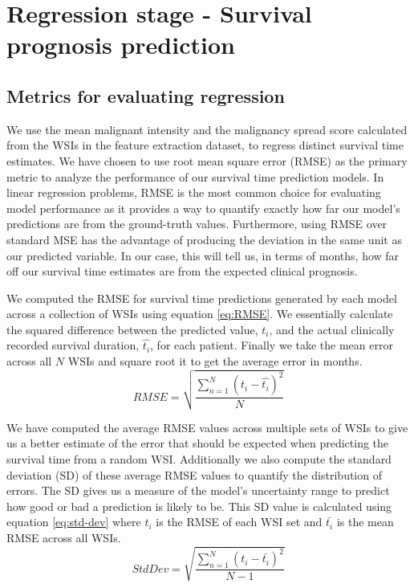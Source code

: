 \documentclass{l4proj}
\begin{document}
\section{Regression stage - Survival prognosis prediction}
\subsection{Metrics for evaluating regression}
We use the mean malignant intensity and the malignancy spread score calculated from the WSIs in the feature extraction dataset, to regress distinct survival time estimates. We have chosen to use root mean square error (RMSE) as the primary metric to analyze the performance of our survival time prediction models. In linear regression problems, RMSE is the most common choice for evaluating model performance as it provides a way to quantify exactly how far our model's predictions are from the ground-truth values. Furthermore, using RMSE over standard MSE has the advantage of producing the deviation in the same unit as our predicted variable. In our case, this will tell us, in terms of months, how far off our survival time estimates are from the expected clinical prognosis. 

We computed the RMSE for survival time predictions generated by each model across a collection of WSIs using equation \ref{eq:RMSE}. We essentially calculate the squared difference between the predicted value, \(t_{i}\), and the actual clinically recorded survival duration, \(\hat{t_{i}}\), for each patient. Finally we take the mean error across all \(N\) WSIs and square root it to get the average error in months. 
\begin{equation} \label{eq:RMSE}
    RMSE = \sqrt{\frac{\sum_{n=1}^{N} (t_{i} - \hat{t_{i}})^2}{N}}
\end{equation}

We have computed the average RMSE values across multiple sets of WSIs to give us a better estimate of the error that should be expected when predicting the survival time from a random WSI. Additionally we also compute the standard deviation (SD) of these average RMSE values to quantify the distribution of errors. The SD gives us a measure of the model's uncertainty range to predict how good or bad a prediction is likely to be. This SD value is calculated using equation \ref{eq:std-dev} where \(t_{i}\) is the RMSE of each WSI set and \(\bar{t_{i}}\) is the mean RMSE across all WSIs. 
\begin{equation} \label{eq:std-dev}
    StdDev = \sqrt{\frac{\sum_{n=1}^{N} (t_{i} - \bar{t_{i}})^2}{N-1}}
\end{equation}
\end{document}
